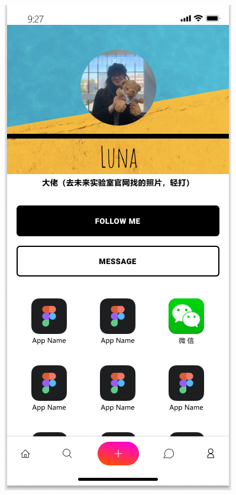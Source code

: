\documentclass[UTF8]{ctexart}
\begin{document}
\begin{figure}[htbp]
{\begin{minipage}[b]{.3\linewidth}
            \includegraphics[scale=0.3]{ViewHomePageSmall.png}
        \end{minipage}
    }
\end{figure}
\end{document}
